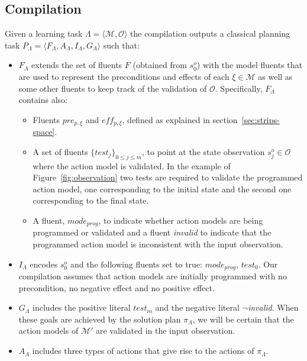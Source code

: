 \documentclass[runningheads]{llncs}
\newcommand{\tup}[1]{{\langle #1 \rangle}}
\begin{document}
\subsection{Compilation}
Given a learning task $\Lambda=\tup{\mathcal{M},{\mathcal O}}$ the compilation outputs a classical planning task $P_{\Lambda}=\tup{F_{\Lambda},A_{\Lambda},I_{\Lambda},G_{\Lambda}}$ such that:
\begin{itemize}
\item $F_{\Lambda}$ extends the set of fluents $F$ (obtained from $s_0^o$) with the model fluents that are used to represent the preconditions and effects of each $\xi\in\mathcal{M}$ as well as some other fluents to keep track of the validation of ${\mathcal O}$. Specifically, $F_{\Lambda}$ contains also:
\begin{itemize}
\item Fluents $pre_{p,\xi}$ and $eff_{p,\xi}$, defined as explained in section~\ref{sec:strips-space}.
\item A set of fluents $\{test_j\}_{0\leq j\leq m}$, to point at the state observation $s_j^o\in {\mathcal O}$ where the action model is validated. In the example of Figure~\ref{fig:observation} two tests are required to validate the programmed action model, one corresponding to the initial state and the second one corresponding to the final state.
\item A fluent, $mode_{prog}$, to indicate whether action models are being programmed or validated and a fluent {\em invalid} to indicate that the programmed action model is inconsistent with the input observation.
\end{itemize}

\item $I_{\Lambda}$ encodes $s_0^o$ and the following fluents set to true: $mode_{prog}$, $test_0$. Our compilation assumes that action models are initially programmed with no precondition, no negative effect and no positive effect.

\item $G_{\Lambda}$ includes the positive literal $test_m$ and the negative literal $\neg${\em invalid}. When these goals are achieved by the solution plan $\pi_\Lambda$, we will be certain that the action models of $\mathcal{M'}$ are validated in the input observation.

\item $A_{\Lambda}$ includes three types of actions that give rise to the actions of $\pi_\Lambda$.
\begin{enumerate}


\end{enumerate}
\end{itemize}
\end{document}
